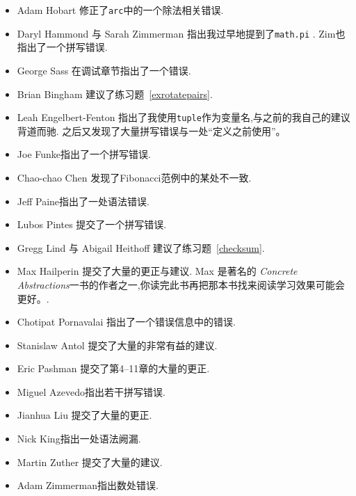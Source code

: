 \begin{itemize}
\item Adam Hobart 修正了{\tt arc}中的一个除法相关错误.

\item Daryl Hammond 与 Sarah Zimmerman 指出我过早地提到了{\tt math.pi} .  Zim也指出了一个拼写错误.

\item George Sass 在调试章节指出了一个错误.

\item Brian Bingham 建议了练习题~\ref{exrotatepairs}.

\item Leah Engelbert-Fenton 指出了我使用{\tt tuple}作为变量名,与之前的我自己的建议背道而驰.  之后又发现了大量拼写错误与一处``定义之前使用''。

\item Joe Funke指出了一个拼写错误.

\item Chao-chao Chen 发现了Fibonacci范例中的某处不一致.

\item Jeff Paine指出了一处语法错误.

\item Lubos Pintes 提交了一个拼写错误.

\item Gregg Lind 与 Abigail Heithoff 建议了练习题~\ref{checksum}.

\item Max Hailperin 提交了大量的更正与建议.  Max 是著名的{\em
    Concrete Abstractions}一书的作者之一,你读完此书再把那本书找来阅读学习效果可能会更好。.

\item Chotipat Pornavalai 指出了一个错误信息中的错误.

\item Stanislaw Antol 提交了大量的非常有益的建议.

\item Eric Pashman 提交了第4--11章的大量的更正.

\item Miguel Azevedo指出若干拼写错误.

\item Jianhua Liu 提交了大量的更正.

\item Nick King指出一处语法阙漏.

\item Martin Zuther 提交了大量的建议.

\item Adam Zimmerman指出数处错误.


\end{itemize}
